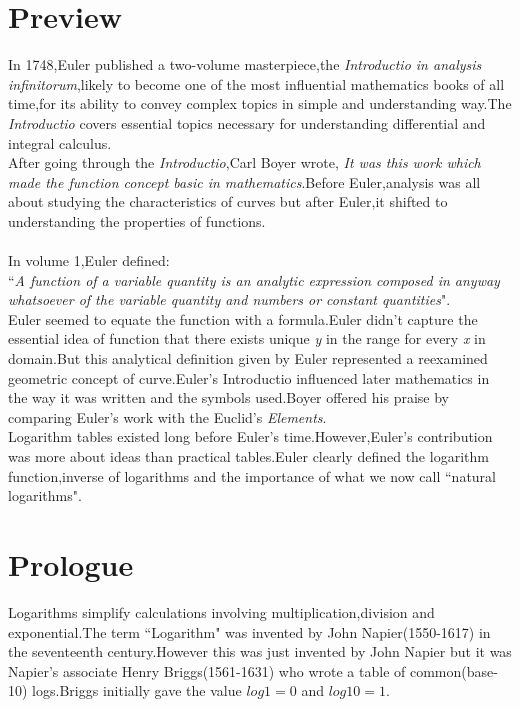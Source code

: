 \documentclass[a4paper,reqno,11pt]{book}
\theoremstyle{plain}%
\theoremstyle{definition}
\begin{document}
\section{Preview}
\noindent In 1748,Euler published a two-volume masterpiece,the \textit{Introductio in analysis infinitorum},likely to become one of the most influential mathematics books of all time,for its ability to convey complex topics in simple and understanding way.The \textit{Introductio} covers essential topics necessary for understanding differential and integral calculus.\\
\indent After going through the \textit{Introductio},Carl Boyer wrote, \textit{It was this work which made the function concept basic in mathematics}.Before Euler,analysis was all about studying the characteristics of curves but after Euler,it shifted to understanding the properties of functions.\\
\\
In volume 1,Euler defined:\\
``\textit{A function of a variable quantity is an analytic expression composed in anyway whatsoever of the variable quantity and numbers or constant quantities}".\cite{ref2}\\
Euler seemed to equate the function with a formula.Euler didn't 
capture the essential idea of function that there exists unique \textit{y} in the range for every \textit{x} in domain.But this analytical definition given by Euler represented a reexamined geometric concept of curve.Euler's Introductio influenced later mathematics in the way it was written and the symbols used.Boyer offered his praise by comparing Euler's work with the Euclid's \textit{Elements}.\\
\indent Logarithm tables existed long before Euler's time.However,Euler's contribution was more about ideas than practical tables.Euler clearly defined the logarithm function,inverse of logarithms and the importance of what we now call ``natural logarithms".

\section{Prologue}
\noindent Logarithms simplify calculations involving multiplication,division and exponential.The term ``Logarithm" was invented by John Napier(1550-1617) in the seventeenth century.However this was just invented by John Napier but it was Napier's associate Henry Briggs(1561-1631) who wrote a table of common(base-10) logs.Briggs initially gave the value $log1=0$ and $log10=1$.\\
\end{document}
